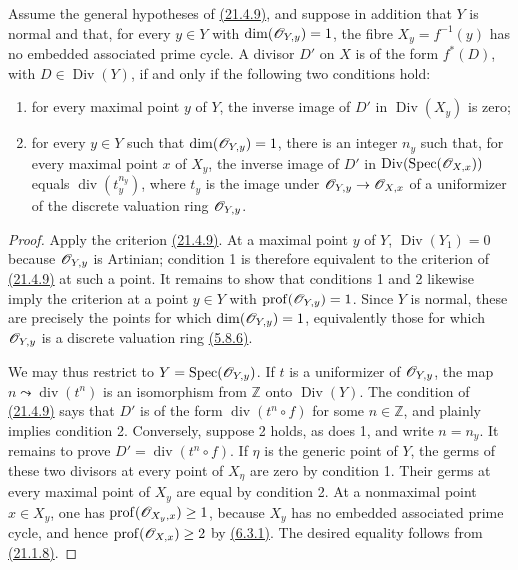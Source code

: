 \begin{corollary}[21.4.10]
\ifdefined\EGAIVSuppressErratumLabels\else\label{IV.21.4.10}\fi
Assume the general hypotheses of {\hyperref[IV.21.4.9]{(21.4.9)}}, and suppose in addition that
$Y$ is normal and that, for every $y\in Y$ with
$\dim(\mathscr{O}_{Y,y})=1$, the fibre $X_y=f^{-1}(y)$ has no embedded
associated prime cycle.  A divisor $D'$ on $X$ is of the form $f^*(D)$,
with $D\in\operatorname{Div}(Y)$, if and only if the following two
conditions hold:
\begin{enumerate}[label=\textup{\arabic*\textdegree}]
\item for every maximal point $y$ of $Y$, the inverse image of $D'$ in
$\operatorname{Div}(X_y)$ is zero;
\item for every $y\in Y$ such that $\dim(\mathscr{O}_{Y,y})=1$, there is an
integer $n_y$ such that, for every maximal point $x$ of $X_y$, the
inverse image of $D'$ in
$\operatorname{Div}(\operatorname{Spec}(\mathscr{O}_{X,x}))$ equals
$\operatorname{div}(t_y^{n_y})$, where $t_y$ is the image under
$\mathscr{O}_{Y,y}\to\mathscr{O}_{X,x}$ of a uniformizer of the discrete
valuation ring $\mathscr{O}_{Y,y}$.
\end{enumerate}
\end{corollary}

\begin{proof}
Apply the criterion {\hyperref[IV.21.4.9]{(21.4.9)}}.  At a maximal point $y$ of $Y$,
$\operatorname{Div}(Y_1)=0$ because $\mathscr{O}_{Y,y}$ is Artinian;
condition 1\textdegree{} is therefore equivalent to the criterion of
{\hyperref[IV.21.4.9]{(21.4.9)}} at such a point.  It remains to show that conditions
1\textdegree{} and 2\textdegree{} likewise imply the criterion at a
point $y\in Y$ with $\operatorname{prof}(\mathscr{O}_{Y,y})=1$.  Since $Y$
is normal, these are precisely the points for which
$\dim(\mathscr{O}_{Y,y})=1$, equivalently those for which
$\mathscr{O}_{Y,y}$ is a discrete valuation ring {\hyperref[IV.5.8.6]{(5.8.6)}}.

We may thus restrict to $Y=\operatorname{Spec}(\mathscr{O}_{Y,y})$.  If $t$
is a uniformizer of $\mathscr{O}_{Y,y}$, the map
$n\leadsto\operatorname{div}(t^n)$ is an isomorphism from $\mathbb Z$
onto $\operatorname{Div}(Y)$.  The condition of {\hyperref[IV.21.4.9]{(21.4.9)}} says that
$D'$ is of the form $\operatorname{div}(t^n\circ f)$ for some
$n\in\mathbb Z$, and plainly implies condition 2\textdegree{}.
Conversely, suppose 2\textdegree{} holds, as does 1\textdegree{}, and
write $n=n_y$.  It remains to prove
$D'=\operatorname{div}(t^n\circ f)$.  If $\eta$ is the generic point of
$Y$, the germs of these two divisors at every point of $X_\eta$ are
zero by condition 1\textdegree{}.  Their germs at every maximal point
of $X_y$ are equal by condition 2\textdegree{}.  At a nonmaximal point
$x\in X_y$, one has
$\operatorname{prof}(\mathscr{O}_{X_y,x})\geq 1$, because $X_y$ has no
embedded associated prime cycle, and hence
$\operatorname{prof}(\mathscr{O}_{X,x})\geq 2$ by {\hyperref[IV.6.3.1]{(6.3.1)}}.  The desired
equality follows from {\hyperref[IV.21.1.8]{(21.1.8)}}.
\end{proof}

